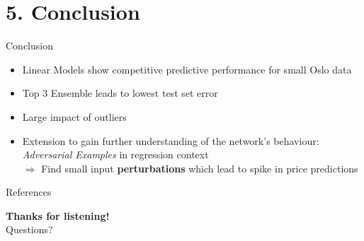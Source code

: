 \documentclass[ngerman,inputenc]{beamer}
\begin{document}
\section{5. Conclusion}

\begin{frame}{Conclusion}
  \begin{itemize}
    \item Linear Models show competitive predictive performance for small Oslo data
    \item Top 3 Ensemble leads to lowest test set error
    \item Large impact of outliers
    \item Extension to gain further understanding of the network's behaviour: \emph{Adversarial Examples} in regression context  \\
          $\Rightarrow$ Find small input \textbf{perturbations} which lead to spike in price predictions
  \end{itemize}
\end{frame}

\begin{frame}{References}
  \tiny
  \nocite{he2015, ioffe2015,kingma2014,kingma2017,srivastava2014,goodfellow2015}
  
  
\end{frame}

\begin{frame}

  \begin{center}
    \LARGE{\textbf{Thanks for listening!}}\\[10mm]
    \large{Questions?}
  \end{center}

\end{frame}
\end{document}
